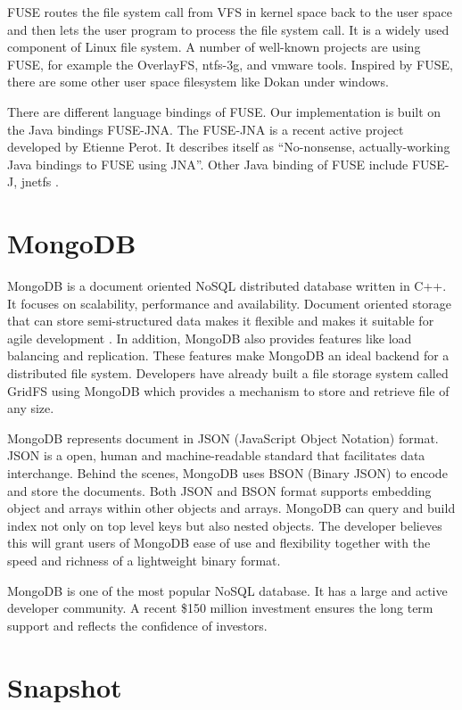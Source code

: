     FUSE routes the file system call from VFS in kernel space back to the user space and then lets the user program to process the file system call. It is a widely used component of Linux file system. A number of well-known projects are using FUSE, for example the OverlayFS, ntfs-3g, and vmware tools. Inspired by FUSE, there are some other user space filesystem like Dokan under windows.

    There are different language bindings of FUSE. Our implementation is built on the Java bindings FUSE-JNA. The FUSE-JNA is a recent active project developed by Etienne Perot. It describes itself as ``No-nonsense, actually-working Java bindings to FUSE using JNA''. \cite{fusejna} Other Java binding of FUSE include FUSE-J, jnetfs .

\section{MongoDB}

    MongoDB is a document oriented NoSQL distributed database written in C++.\cite{mongodb} It focuses on scalability, performance and availability.\cite{mongo_overview} Document oriented storage that can store semi-structured data makes it flexible and makes it suitable for agile development \cite{docdb}. In addition, MongoDB also provides features like load balancing and replication. These features make MongoDB an ideal backend for a distributed file system. Developers have already built a file storage system called GridFS using MongoDB which provides a mechanism to store and retrieve file of any size.\cite{gridfs}

    MongoDB represents document in JSON (JavaScript Object Notation) format. JSON is a open, human and machine-readable standard that facilitates data interchange. Behind the scenes, MongoDB uses BSON (Binary JSON) to encode and store the documents. Both JSON and BSON format supports embedding object and arrays within other objects and arrays. MongoDB can query and build index not only on top level keys but also nested objects. The developer believes this will grant users of MongoDB ease of use and flexibility together with the speed and richness of a lightweight binary format.\cite{bson}

    MongoDB is one of the most popular NoSQL database. It has a large and active developer community. A recent \$150 million investment ensures the long term support and reflects the confidence of investors.

\section{Snapshot}

